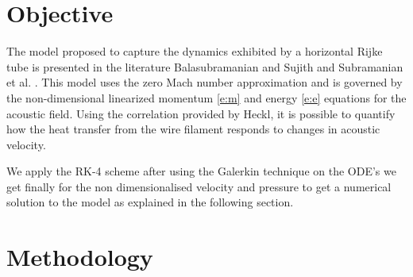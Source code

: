 \documentclass[8pt]{article} %
\begin{document}
\section{Objective}
The model proposed to capture the dynamics exhibited by a horizontal Rijke tube is presented in the literature Balasubramanian and Sujith\cite{refpaper1} and Subramanian et al. \cite{refpaper2}. This model uses the zero Mach number approximation and is governed by the non-dimensional linearized momentum \ref{e:m} and energy \ref{e:e} equations for the acoustic field. Using the correlation provided by Heckl, it is possible to quantify how the heat transfer from the wire filament responds to changes in acoustic velocity.

We apply the RK-4 scheme after using the Galerkin technique on the ODE's we get finally for the non dimensionalised velocity and pressure to get a numerical solution to the model as explained in the following section.

\section{Methodology}
\end{document}
